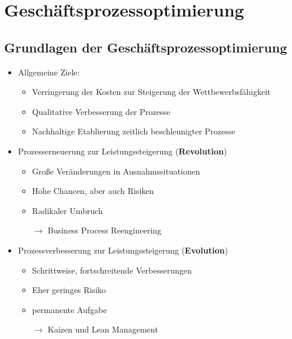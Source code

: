\documentclass[11pt,a4paper]{article}
\begin{document}
\section{Geschäftsprozessoptimierung}
\subsection{Grundlagen der Geschäftsprozessoptimierung}
\begin{itemize}
\item Allgemeine Ziele:
	\begin{itemize}
	\item Verringerung der Kosten zur Steigerung der Wettbewerbsfähigkeit
	\item Qualitative Verbesserung der Prozesse
	\item Nachhaltige Etablierung zeitlich beschleunigter Prozesse
	\end{itemize}
\item Prozesserneuerung zur Leistungssteigerung (\textbf{Revolution})
	\begin{itemize}
	\item Große Veränderungen in Ausnahmssituationen
	\item Hohe Chancen, aber auch Risiken
	\item Radikaler Umbruch
	\item[$\rightarrow$] Business Process Reengineering
	\end{itemize}

\item Prozessverbesserung zur Leistungssteigerung (\textbf{Evolution})
	\begin{itemize}
	\item Schrittweise, fortschreitende Verbesserungen
	\item Eher geringes Risiko
	\item permanente Aufgabe
	\item[$\rightarrow$] Kaizen und Lean Management
	\end{itemize}
\end{itemize}
\end{document}
